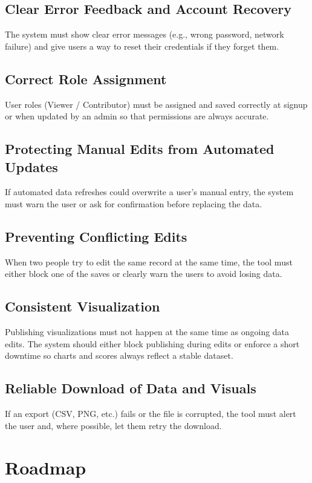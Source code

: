 \documentclass{article}
\begin{document}
\subsection*{Clear Error Feedback and Account Recovery}
The system must show clear error messages (e.g., wrong password, network failure) and give users a way to reset their credentials if they forget them.

\subsection*{Correct Role Assignment}
User roles (Viewer / Contributor) must be assigned and saved correctly at signup or when updated by an admin so that permissions are always accurate.

\subsection*{Protecting Manual Edits from Automated Updates}
If automated data refreshes could overwrite a user’s manual entry, the system must warn the user or ask for confirmation before replacing the data.

\subsection*{Preventing Conflicting Edits}
When two people try to edit the same record at the same time, the tool must either block one of the saves or clearly warn the users to avoid losing data.

\subsection*{Consistent Visualization}
Publishing visualizations must not happen at the same time as ongoing data edits.
The system should either block publishing during edits or enforce a short downtime so charts and scores always reflect a stable dataset.

\subsection*{Reliable Download of Data and Visuals}
If an export (CSV, PNG, etc.) fails or the file is corrupted, the tool must alert the user and, where possible, let them retry the download.

\section{Roadmap}
\end{document}

